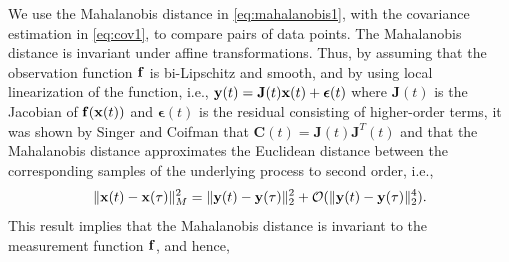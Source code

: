 We use the Mahalanobis distance in \eqref{eq:mahalanobis1}, with the covariance estimation in \eqref{eq:cov1}, to compare pairs of data points.
%
%
The Mahalanobis distance is invariant under affine transformations.
%
Thus, by assuming that the observation function $\mathbf{f}$ is bi-Lipschitz and smooth, and by using local linearization of the function, i.e., $\mathbf{y}(t) = \mathbf{J}(t) \mathbf{x}(t) + \boldsymbol{\epsilon}(t)$ where $\mathbf{J}(t)$ is the Jacobian of $\mathbf{f}(\mathbf{x}(t))$ and $\boldsymbol{\epsilon}(t)$ is the residual consisting of higher-order terms, it was shown by Singer and Coifman \cite{singer2008non} that $\mathbf{C}(t) = \mathbf{J}(t)\mathbf{J}^T(t)$ and that the Mahalanobis distance approximates the Euclidean distance between the corresponding samples of the underlying process to second order, i.e.,
\begin{equation}
	\| \mathbf{x}(t) - \mathbf{x}(\tau) \|^2_M = \| \mathbf{y}(t) - \mathbf{y}(\tau)\|^2_2 + \mathcal{O}(\| \mathbf{y}(t) - \mathbf{y}(\tau)\|_2^4).
\end{equation}
%
This result implies that the Mahalanobis distance is invariant to the measurement function $\mathbf{f}$, and hence,
